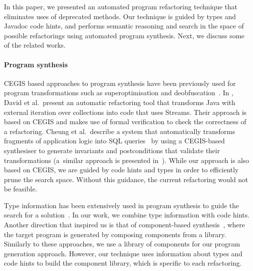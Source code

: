 \documentclass[sigconf,review,anonymous]{acmart}
\begin{document}
In this paper, we presented an automated program refactoring
technique that eliminates uses of deprecated methods. Our
technique is guided by types and Javadoc code hints, and
performs semantic reasoning and search in the space of possible
refactorings using automated program synthesis. Next, we discuss some of the related works.

\paragraph{Program synthesis}


CEGIS based approaches to program synthesis have been previously used
for program transformations such as superoptimisation and
deobfuscation~\cite{DBLP:conf/icse/JhaGST10}.  In
\cite{DBLP:journals/corr/abs-1712-07388}, David et al.~present an
automatic refactoring tool that transforms Java with external
iteration over collections into code that uses Streams. Their approach
is based on CEGIS and makes use of formal verification to check the
correctness of a refactoring.  Cheung et al.~describe a system that
automatically transforms fragments of application logic into SQL
queries~\cite{DBLP:conf/pldi/CheungSM13} by using a CEGIS-based
synthesiser to generate invariants and postconditions that validate
their transformations (a~similar approach is presented
in~\cite{DBLP:conf/cc/IuCZ10}).  While our approach is also based
on CEGIS, we are guided by code hints and types in
order to efficiently prune the search space. Without this guidance,
the current refactoring would not be feasible.  

Type information has been extensively used in program synthesis to
guide the search for a solution~\cite{DBLP:conf/sfp/Katayama05,DBLP:conf/pldi/FeserCD15,DBLP:conf/pldi/OseraZ15,DBLP:journals/pacmpl/LubinCOC20,DBLP:journals/pacmpl/YamaguchiMDW21}.
In our work, we combine type information with code hints.
%
Another direction that inspired us is that of component-based synthesis~\cite{DBLP:conf/icse/JhaGST10,DBLP:conf/pldi/GulwaniJTV11,DBLP:conf/popl/FengM0DR17}, where the target program is generated by composing components from a library. Similarly
to these approaches, we use a library of components for our program
generation approach. However, our technique uses information about types
and code hints to build the component library, which is specific to each refactoring.

\end{document}
